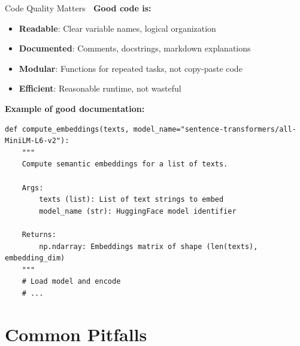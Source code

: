 \documentclass[aspectratio=169]{beamer}
\begin{document}
\begin{frame}[fragile]{Code Quality Matters 💎}
\textbf{Good code is:}
\begin{itemize}\setlength{\itemsep}{0pt}
    \item \textbf{Readable}: Clear variable names, logical organization
    \item \textbf{Documented}: Comments, docstrings, markdown explanations
    \item \textbf{Modular}: Functions for repeated tasks, not copy-paste code
    \item \textbf{Efficient}: Reasonable runtime, not wasteful
\end{itemize}

\vspace{0.3cm}

\textbf{Example of good documentation:}
\begin{lstlisting}
def compute_embeddings(texts, model_name="sentence-transformers/all-MiniLM-L6-v2"):
    """
    Compute semantic embeddings for a list of texts.

    Args:
        texts (list): List of text strings to embed
        model_name (str): HuggingFace model identifier

    Returns:
        np.ndarray: Embeddings matrix of shape (len(texts), embedding_dim)
    """
    # Load model and encode
    # ...
\end{lstlisting}
\end{frame}

\section{Common Pitfalls}
\end{document}
